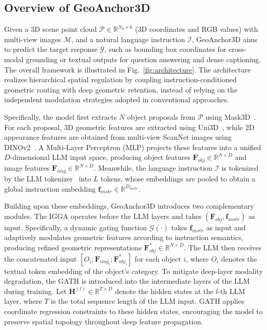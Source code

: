 \documentclass[lettersize,journal]{IEEEtran}
\begin{document}
\subsection{Overview of GeoAnchor3D}

Given a 3D scene point cloud $\mathcal{P} \in \mathbb{R}^{N_p \times 6}$ {(3D coordinates and RGB values) with multi-view images $\mathcal{M}$}, and a natural language instruction $\mathcal{I}$, GeoAnchor3D aims to predict the target response $\mathcal{Y}$, such as bounding box coordinates for {cross-modal} grounding or textual outputs for question answering and dense captioning. The overall framework is illustrated in Fig.~\ref{fig:architecture}. The architecture realizes hierarchical spatial regulation by coupling instruction-conditioned geometric routing with deep geometric retention, {instead of relying on the independent modulation strategies adopted in conventional approaches.}

Specifically, the model first extracts $N$ object proposals from $\mathcal{P}$ using Mask3D~\cite{mask3d2023}. For each proposal, 3D geometric features are extracted using Uni3D~\cite{uni3d2024}, while 2D appearance features are obtained from multi-view ScanNet images using DINOv2~\cite{dinov22023}. A Multi-Layer Perceptron (MLP) projects these features into a unified $D$-dimensional LLM input space, producing object features $\mathbf{F}_{obj} \in \mathbb{R}^{N \times D}$ and image features $\mathbf{F}_{img} \in \mathbb{R}^{N \times D}$. Meanwhile, the language instruction $\mathcal{I}$ is tokenized by the LLM tokenizer~\cite{llama2023} into $L$ tokens, whose embeddings are pooled to obtain a global instruction embedding $\mathbf{f}_{instr} \in \mathbb{R}^{D_{instr}}$. 

Building upon these embeddings, GeoAnchor3D introduces two complementary modules. The IGGA operates before the LLM layers and takes $(\mathbf{F}_{obj}, \mathbf{f}_{instr})$ as input. Specifically, a dynamic gating function $\mathcal{G}(\cdot)$ {takes $\mathbf{f}_{instr}$ as input} and adaptively modulates geometric features according to instruction semantics, producing refined geometric representations $\mathbf{F}_{obj}^{*} \in \mathbb{R}^{N \times D}$. The LLM then receives the concatenated input $[O_i; \mathbf{F}_{img_i}; \mathbf{F}_{obj_i}^{*}]$ for each object $i$, where $O_i$ denotes the textual token embedding of the object's category. To mitigate deep-layer {modality} degradation, the GATH is introduced into the intermediate layers of the LLM during training. Let $\mathbf{H}^{(l)} \in \mathbb{R}^{T \times D}$ denote the hidden states at the $l$-th LLM layer, where $T$ is the total sequence length of the LLM input. GATH applies coordinate regression constraints to these hidden states, encouraging the model to preserve spatial topology throughout deep feature propagation.
\end{document}
